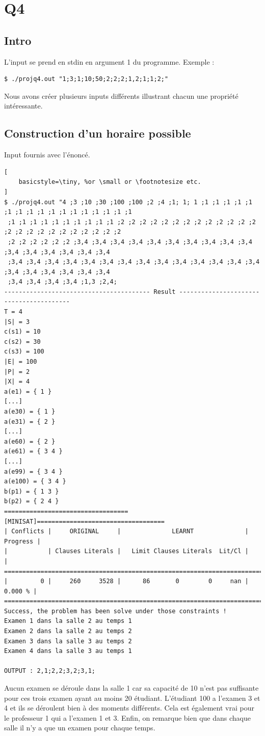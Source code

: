 \documentclass[a4paper,11pt]{article}
\begin{document}
\section{Q4}

\subsection{Intro}
L'input se prend en stdin en argument 1 du programme. Exemple :

\begin{lstlisting}
$ ./projq4.out "1;3;1;10;50;2;2;2;1,2;1;1;2;"
\end{lstlisting}

Nous avons créer plusieurs inputs différents illustrant chacun une propriété intéressante.
\subsection{Construction d'un horaire possible}
Input fournis avec l'énoncé.
\begin{lstlisting}[
    basicstyle=\tiny, %or \small or \footnotesize etc.
]
$ ./projq4.out "4 ;3 ;10 ;30 ;100 ;100 ;2 ;4 ;1; 1; 1 ;1 ;1 ;1 ;1 ;1 ;1 ;1 ;1 ;1 ;1 ;1 ;1 ;1 ;1 ;1 ;1 ;1
 ;1 ;1 ;1 ;1 ;1 ;1 ;1 ;1 ;1 ;1 ;2 ;2 ;2 ;2 ;2 ;2 ;2 ;2 ;2 ;2 ;2 ;2 ;2 ;2 ;2 ;2 ;2 ;2 ;2 ;2 ;2 ;2 ;2 ;2 
 ;2 ;2 ;2 ;2 ;2 ;2 ;3,4 ;3,4 ;3,4 ;3,4 ;3,4 ;3,4 ;3,4 ;3,4 ;3,4 ;3,4 ;3,4 ;3,4 ;3,4 ;3,4 ;3,4 ;3,4 
 ;3,4 ;3,4 ;3,4 ;3,4 ;3,4 ;3,4 ;3,4 ;3,4 ;3,4 ;3,4 ;3,4 ;3,4 ;3,4 ;3,4 ;3,4 ;3,4 ;3,4 ;3,4 ;3,4 ;3,4 
 ;3,4 ;3,4 ;3,4 ;3,4 ;1,3 ;2,4;
---------------------------------------- Result ----------------------------------------
T = 4
|S| = 3
c(s1) = 10
c(s2) = 30
c(s3) = 100
|E| = 100
|P| = 2
|X| = 4
a(e1) = { 1 }
[...]
a(e30) = { 1 }
a(e31) = { 2 }
[...]
a(e60) = { 2 }
a(e61) = { 3 4 }
[...]
a(e99) = { 3 4 }
a(e100) = { 3 4 }
b(p1) = { 1 3 }
b(p2) = { 2 4 }
==================================[MINISAT]===================================
| Conflicts |     ORIGINAL     |              LEARNT              | Progress |
|           | Clauses Literals |   Limit Clauses Literals  Lit/Cl |          |
==============================================================================
|         0 |     260     3528 |      86       0        0     nan |  0.000 % |
==============================================================================
Success, the problem has been solve under those constraints !
Examen 1 dans la salle 2 au temps 1
Examen 2 dans la salle 2 au temps 2
Examen 3 dans la salle 3 au temps 2
Examen 4 dans la salle 3 au temps 1

OUTPUT : 2,1;2,2;3,2;3,1;
\end{lstlisting}
Aucun examen se déroule dans la salle 1 car sa capacité de 10 n'est pas suffisante pour ces trois examen ayant au moins 20 étudiant.
L'étudiant 100 a l'examen 3 et 4 et ils se déroulent bien à des moments différents.
Cela est également vrai pour le professeur 1 qui a l'examen 1 et 3.
Enfin, on remarque bien que dans chaque salle il n'y a que un examen pour chaque temps.
\end{document}
